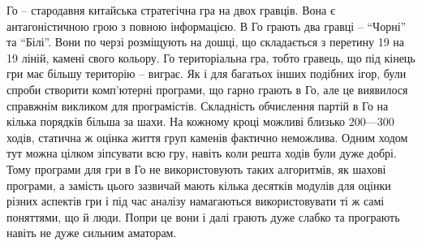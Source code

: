 \intro
Го -- стародавня китайська стратегічна гра на двох гравців. Вона є антагоністичною грою з повною інформацією. В Го грають два гравці -- ``Чорні'' та ``Білі''. Вони по черзі розміщують на дошці, що складається з перетину 19 на 19 ліній, камені свого кольору. Го територіальна гра, тобто гравець, що під кінець гри має більшу територію -- виграє. Як і для багатьох інших подібних ігор, були спроби створити комп'ютерні програми, що гарно грають в Го, але це виявилося справжнім викликом для програмістів. Складність обчислення партій в Го на кілька порядків більша за шахи. На кожному кроці можливі близько 200—300 ходів, статична ж оцінка життя груп каменів фактично неможлива. Одним ходом тут можна цілком зіпсувати всю гру, навіть коли решта ходів були дуже добрі. Тому програми для гри в Го не використовують таких алгоритмів, як шахові програми, а замість цього зазвичай мають кілька десятків модулів для оцінки різних аспектів гри і під час аналізу намагаються використовувати ті ж самі поняттями, що й люди. Попри це вони і далі грають дуже слабко та програють навіть не дуже сильним аматорам.




